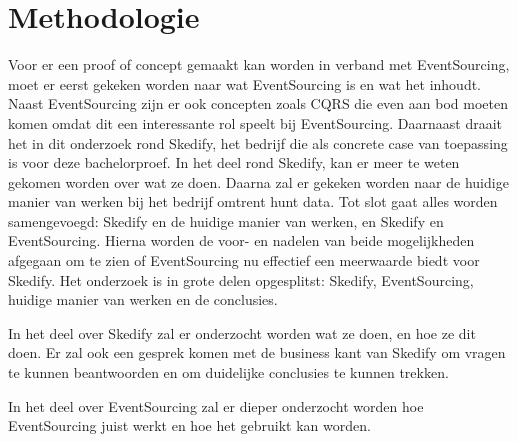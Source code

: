 
\chapter{Methodologie}
\label{ch:methodologie}



Voor er een proof of concept gemaakt kan worden in verband met EventSourcing, moet er eerst gekeken worden naar wat EventSourcing is en wat het inhoudt. Naast EventSourcing zijn er ook concepten zoals CQRS die even aan bod moeten komen omdat dit een interessante rol speelt bij EventSourcing. Daarnaast draait het in dit onderzoek rond Skedify, het bedrijf die als concrete case van toepassing is voor deze bachelorproef. In het deel rond Skedify, kan er meer te weten gekomen worden over wat ze doen. Daarna zal er gekeken worden naar de huidige manier van werken bij het bedrijf omtrent hunt data. Tot slot gaat alles worden samengevoegd: Skedify en de huidige manier van werken, en Skedify en EventSourcing. Hierna worden de voor- en nadelen van beide mogelijkheden afgegaan om te zien of EventSourcing nu effectief een meerwaarde biedt voor Skedify. Het onderzoek is in grote delen opgesplitst: Skedify, EventSourcing, huidige manier van werken en de conclusies.

In het deel over Skedify zal er onderzocht worden wat ze doen, en hoe ze dit doen. Er zal ook een gesprek komen met de business kant van Skedify om vragen te kunnen beantwoorden en om duidelijke conclusies te kunnen trekken.

In het deel over EventSourcing zal er dieper onderzocht worden hoe EventSourcing juist werkt en hoe het gebruikt kan worden.